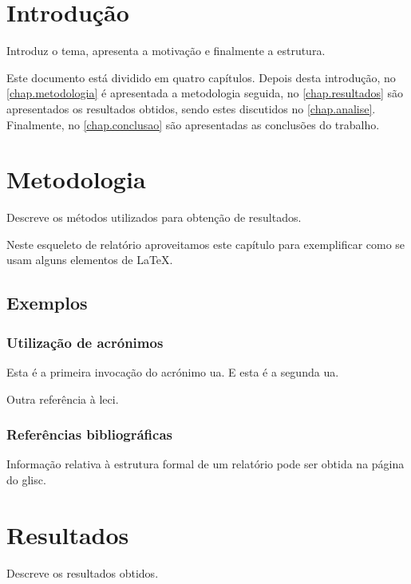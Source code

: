 \documentclass{report}
\begin{document}
\tableofcontents


\clearpage
{}

\chapter{Introdução}
\label{chap.introducao}

Introduz o tema, apresenta a motivação e finalmente a estrutura.

Este documento está dividido em quatro capítulos.
Depois desta introdução,
no \autoref{chap.metodologia} é apresentada a metodologia seguida,
no \autoref{chap.resultados} são apresentados os resultados obtidos,
sendo estes discutidos no \autoref{chap.analise}.
Finalmente, no \autoref{chap.conclusao} são apresentadas
as conclusões do trabalho.

\chapter{Metodologia}
\label{chap.metodologia}
Descreve os métodos utilizados para obtenção de resultados.

Neste esqueleto de relatório aproveitamos este capítulo para exemplificar
como se usam alguns elementos de {\LaTeX}.

\section{Exemplos}

\subsection{Utilização de acrónimos}
Esta é a primeira invocação do acrónimo \ac{ua}.
E esta é a segunda \ac{ua}.

Outra referência à \ac{leci}.

\subsection{Referências bibliográficas}
Informação relativa à estrutura formal de um relatório pode ser obtida
na página do \ac{glisc}\cite{glisc}.

\chapter{Resultados}
\label{chap.resultados}
Descreve os resultados obtidos.
\end{document}
